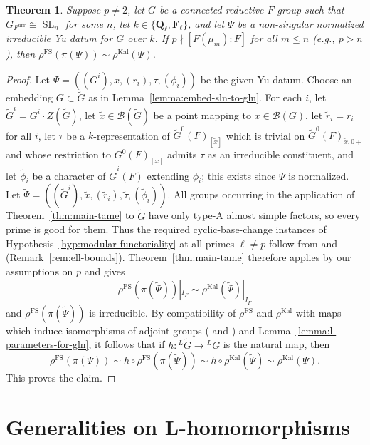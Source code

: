 \documentclass[reqno]{amsart}
\numberwithin{equation}{subsection}
\newcommand{\F}{\mathbf{F}}
\newcommand{\wt}[1]{\widetilde{#1}}
\newcommand{\Q}{\mathbf{Q}}
\newcommand{\ol}[1]{\overline{#1}}
\newcommand{\co}{\colon}
\newcommand{\ld}{{}^L}
\newcommand\cB{\mathcal{B}}
\DeclareMathOperator{\SL}{SL}
\DeclareMathOperator{\unr}{unr}
\DeclareMathOperator{\FS}{FS}
\DeclareMathOperator{\Kal}{Kal}
\newtheorem{thm}{Theorem}[subsection]
\theoremstyle{remark}
\numberwithin{equation}{subsection}
\numberwithin{figure}{subsection}
\begin{document}
\begin{thm}\label{thm:sln-full-conjugacy}
Suppose $p \neq 2$, let $G$ be a connected reductive $F$-group such that $G_{F^{\unr}} \cong \SL_n$ for some $n$, let $k \in \{\ol\Q_\ell, \ol\F_\ell\}$, and let $\Psi$ be a non-singular normalized irreducible Yu datum for $G$ over $k$. If $p \nmid [F(\mu_m):F]$ for all $m \leq n$ (e.g., $p > n$), then $\rho^{\FS}(\pi(\Psi)) \sim \rho^{\Kal}(\Psi)$.
\end{thm}

\begin{proof}
Let $\Psi = ((G^i), x, (r_i), \tau, (\phi_i))$ be the given Yu datum. Choose an embedding $G \subset \wt G$ as in Lemma~\ref{lemma:embed-sln-to-gln}. For each $i$, let $\wt G^i = G^i \cdot Z(\wt G)$, let $\wt x \in \cB(\wt G)$ be a point mapping to $x \in \cB(G)$, let $\wt r_i = r_i$ for all $i$, let $\wt\tau$ be a $k$-representation of $\wt G^0(F)_{[\wt x]}$ which is trivial on $\wt G^0(F)_{\wt x,0+}$ and whose restriction to $G^0(F)_{[x]}$ admits $\tau$ as an irreducible constituent, and let $\wt\phi_i$ be a character of $\wt G^i(F)$ extending $\phi_i$; this exists since $\Psi$ is normalized. Let $\wt\Psi = ((\wt G^i),\wt x,(\wt r_i), \wt\tau, (\wt\phi_i))$. All groups occurring in the application of Theorem~\ref{thm:main-tame} to $\wt G$ have only type-A almost simple factors, so every prime is good for them. Thus the required cyclic-base-change instances of Hypothesis~\ref{hyp:modular-functoriality} at all primes $\ell \neq p$ follow from \cite[Theorem 1.3.1]{F24} and \cite{Wei26} (Remark~\ref{rem:ell-bounds}). Theorem~\ref{thm:main-tame} therefore applies by our assumptions on $p$ and gives
\[
\rho^{\FS}(\pi(\wt\Psi))|_{I_F} \sim \rho^{\Kal}(\wt\Psi)|_{I_F}
\]
and $\rho^{\FS}(\pi(\wt\Psi))$ is irreducible. By compatibility of $\rho^{\FS}$ and $\rho^{\Kal}$ with maps which induce isomorphisms of adjoint groups (\cite[Lemma~7.4.1]{CF26a} and \cite[Theorem I.9.6(v)]{FS}) and Lemma~\ref{lemma:l-parameters-for-gln}, it follows that if $h\co \ld \wt G \to \ld G$ is the natural map, then 
\[
\rho^{\FS}(\pi(\Psi)) \sim h \circ \rho^{\FS}(\pi(\wt\Psi)) \sim h \circ \rho^{\Kal}(\wt\Psi) \sim \rho^{\Kal}(\Psi).
\]
This proves the claim.
\end{proof}


\appendix
\section{Generalities on L-homomorphisms}\label{app:l-homs}
\end{document}
